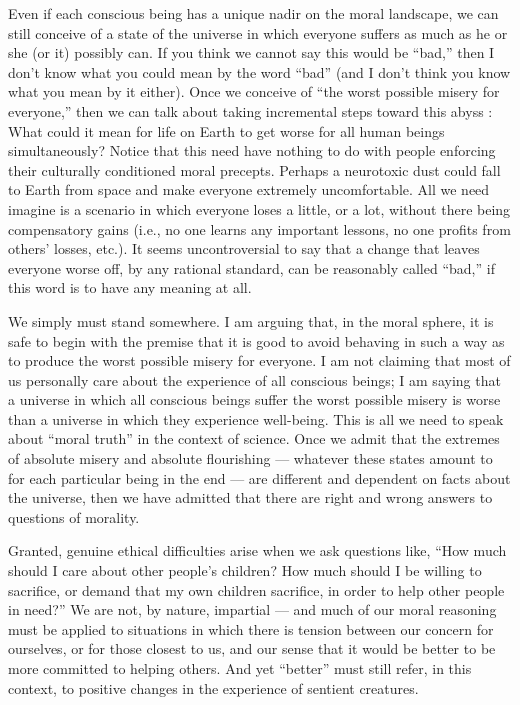 \documentclass[a4paper,14pt]{extbook}
\begin{document}
Even if each conscious being has a unique nadir on the moral landscape, we can still conceive of a state of the universe in which everyone suffers as much as he or she (or it) possibly can.
If you think we cannot say this would be ``bad,'' then I don't know what you could mean by the word ``bad'' (and I don't think you know what you mean by it either).
Once we conceive of ``the worst possible misery for everyone,'' then we can talk about taking incremental steps toward this abyss :
What could it mean for life on Earth to get worse for all human beings simultaneously?
Notice that this need have nothing to do with people enforcing their culturally conditioned moral precepts.
Perhaps a neurotoxic dust could fall to Earth from space and make everyone extremely uncomfortable.
All we need imagine is a scenario in which everyone loses a little, or a lot, without there being compensatory gains (i.e., no one learns any important lessons, no one profits from others' losses, etc.).
It seems uncontroversial to say that a change that leaves everyone worse off, by any rational standard, can be reasonably called ``bad,'' if this word is to have any meaning at all.

We simply must stand somewhere. I am arguing that, in the moral sphere, it is safe to begin with the premise that it is good to avoid behaving in such a way as to produce the worst possible misery for everyone.
I am not claiming that most of us personally care about the experience of all conscious beings;
I am saying that a universe in which all conscious beings suffer the worst possible misery is worse than a universe in which they experience well-being.
This is all we need to speak about ``moral truth'' in the context of science.
Once we admit that the extremes of absolute misery and absolute flourishing --- whatever these states amount to for each particular being in the end --- are different and dependent on facts about the universe, then we have admitted that there are right and wrong answers to questions of morality.

Granted, genuine ethical difficulties arise when we ask questions like, ``How much should I care about other people's children?
How much should I be willing to sacrifice, or demand that my own children sacrifice, in order to help other people in need?''
We are not, by nature, impartial --- and much of our moral reasoning must be applied to situations in which there is tension between our concern for ourselves, or for those closest to us, and our sense that it would be better to be more committed to helping others.
And yet ``better'' must still refer, in this context, to positive changes in the experience of sentient creatures.
\end{document}
